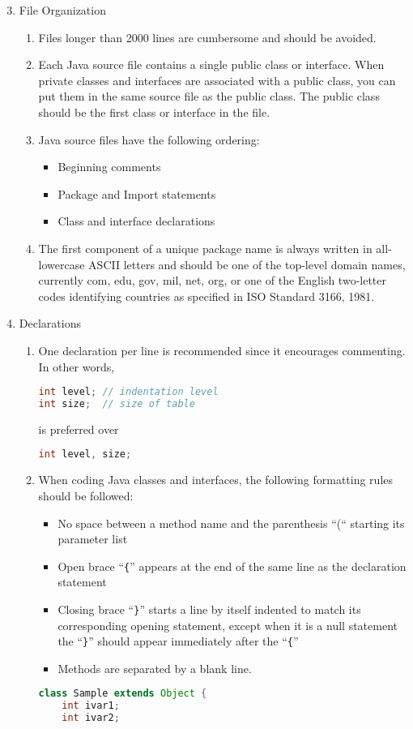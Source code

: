\begin{enumerate}
\setcounter{enumi}{2}
\item File Organization
  \begin{enumerate}
  \item Files longer than 2000 lines are cumbersome and should be avoided.
  \item Each Java source file contains a single public class or
  interface. When private classes and interfaces are associated with a public
  class, you can put them in the same source file as the public class. The
  public class should be the first class or interface in the file.
\item Java source files have the following ordering:
  \begin{itemize}
    \item Beginning comments %
    \item Package and Import statements
    \item Class and interface declarations
  \end{itemize}
\item The first component of a unique package name is always written in
  all-lowercase ASCII letters and should be one of the top-level domain names,
  currently com, edu, gov, mil, net, org, or one of the English two-letter
  codes identifying countries as specified in ISO Standard 3166, 1981.
  \end{enumerate}
\ifslides
\newpage
\fi
\setcounter{enumi}{5}
\item Declarations
  \begin{enumerate}
  \item One declaration per line is recommended since it encourages
  commenting. In other words,
    \begin{lstlisting}[language=java]
int level; // indentation level
int size;  // size of table
    \end{lstlisting}
    is preferred over
    \begin{lstlisting}[language=java]
int level, size;
    \end{lstlisting}
\ifslides
\newpage
\fi
  \item When coding Java classes and interfaces, the following formatting
  rules should be followed:
\begin{itemize}
    \item No space between a method name and the parenthesis ``(`` starting its
      parameter list
    \item Open brace ``\verb+{+'' appears at the end of the same line as the
        declaration statement
    \item Closing brace ``\verb+}+'' starts a line by itself indented to match
    its corresponding opening statement, except when it is a null statement
    the ``\verb+}+'' should appear immediately after the ``\verb+{+''
  \item Methods are separated by a blank line.
  \end{itemize}
\ifslides
\newpage
\fi
    \begin{lstlisting}[language=java]
class Sample extends Object {
    int ivar1;
    int ivar2;


\end{lstlisting}
\end{enumerate}
\end{enumerate}
